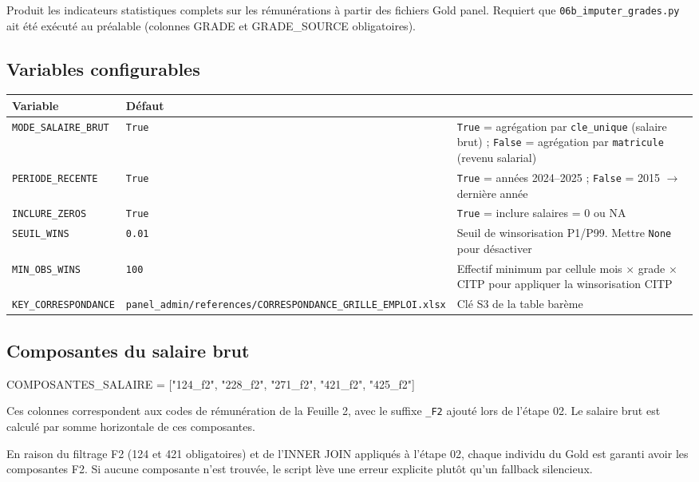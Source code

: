 \documentclass[12pt,a4paper,french]{report}
\begin{document}
Produit les indicateurs statistiques complets sur les rémunérations à partir
des fichiers Gold panel. Requiert que \texttt{06b\_imputer\_grades.py} ait
été exécuté au préalable (colonnes GRADE et GRADE\_SOURCE obligatoires).

\subsection{Variables configurables}

\begin{tabularx}{\textwidth}{lX}
  \toprule
  \textbf{Variable} & \textbf{Défaut} & \\
  \midrule
  \texttt{MODE\_SALAIRE\_BRUT} & \texttt{True} &
    \texttt{True} = agrégation par \texttt{cle\_unique} (salaire brut) ;
    \texttt{False} = agrégation par \texttt{matricule} (revenu salarial) \\
  \texttt{PERIODE\_RECENTE} & \texttt{True} &
    \texttt{True} = années 2024--2025 ; \texttt{False} = 2015 $\rightarrow$
    dernière année \\
  \texttt{INCLURE\_ZEROS} & \texttt{True} &
    \texttt{True} = inclure salaires = 0 ou NA \\
  \texttt{SEUIL\_WINS} & \texttt{0.01} &
    Seuil de winsorisation P1/P99. Mettre \texttt{None} pour désactiver \\
  \texttt{MIN\_OBS\_WINS} & \texttt{100} &
    Effectif minimum par cellule mois $\times$ grade $\times$ CITP pour
    appliquer la winsorisation CITP \\
  \texttt{KEY\_CORRESPONDANCE} &
    \texttt{panel\_admin/references/CORRESPONDANCE\_GRILLE\_EMPLOI.xlsx} &
    Clé S3 de la table barème \\
  \bottomrule
\end{tabularx}

\subsection{Composantes du salaire brut}

\begin{codebox}[]
COMPOSANTES\_SALAIRE = ["124\_f2", "228\_f2", "271\_f2", "421\_f2", "425\_f2"]
\end{codebox}

Ces colonnes correspondent aux codes de rémunération de la Feuille 2, avec
le suffixe \texttt{\_F2} ajouté lors de l'étape 02. Le salaire brut est
calculé par somme horizontale de ces composantes.

\begin{warningbox}
  En raison du filtrage F2 (124 et 421 obligatoires) et de l'INNER JOIN
  appliqués à l'étape 02, chaque individu du Gold est garanti avoir les
  composantes F2. Si aucune composante n'est trouvée, le script lève une
  erreur explicite plutôt qu'un fallback silencieux.
\end{warningbox}
\end{document}
